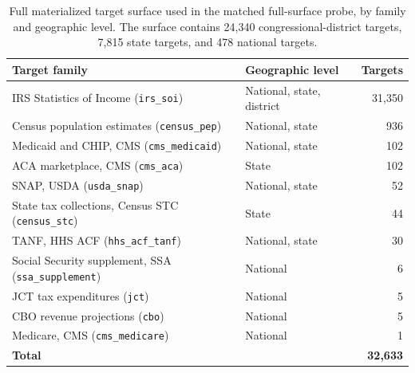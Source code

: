 \begin{table}[H]
\centering
{\tablefont
\begin{tabular}{@{}p{}l r@{}}
\toprule
Target family & Geographic level & Targets \\
\midrule
IRS Statistics of Income (\texttt{irs\_soi}) & National, state, district & 31{,}350 \\
Census population estimates (\texttt{census\_pep}) & National, state & 936 \\
Medicaid and CHIP, CMS (\texttt{cms\_medicaid}) & National, state & 102 \\
ACA marketplace, CMS (\texttt{cms\_aca}) & State & 102 \\
SNAP, USDA (\texttt{usda\_snap}) & National, state & 52 \\
State tax collections, Census STC (\texttt{census\_stc}) & State & 44 \\
TANF, HHS ACF (\texttt{hhs\_acf\_tanf}) & National, state & 30 \\
Social Security supplement, SSA (\texttt{ssa\_supplement}) & National & 6 \\
JCT tax expenditures (\texttt{jct}) & National & 5 \\
CBO revenue projections (\texttt{cbo}) & National & 5 \\
Medicare, CMS (\texttt{cms\_medicare}) & National & 1 \\
\midrule
\textbf{Total} & & \textbf{32{,}633} \\
\bottomrule
\end{tabular}
}
\caption{Full materialized \populace{} target surface used in the matched full-surface probe, by family and
geographic level. The surface contains 24{,}340 congressional-district targets, 7{,}815 state targets, and
478 national targets.}
\label{sp:tab:target_subset}
\end{table}
